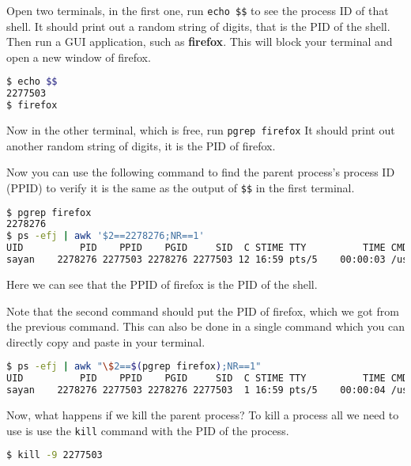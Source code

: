 Open two terminals, in the first one, run \texttt{echo \$\$} to see the
process ID of that shell.
It should print out a random string of digits, that is the PID of the shell.
Then run a GUI application, such as \textbf{firefox}.
This will block your terminal and open a new window of firefox.

\begin{lstlisting}[language=bash]
$ echo $$
2277503
$ firefox
\end{lstlisting}

Now in the other terminal, which is free, run \texttt{pgrep firefox}
It should print out another random string of digits, it is the PID of
firefox.

Now you can use the following command to find the parent process's process
ID (PPID) to verify it is the same as the output of \texttt{\$\$} in the first terminal.

\begin{lstlisting}[language=bash]
$ pgrep firefox
2278276
$ ps -efj | awk '$2==2278276;NR==1'
UID          PID    PPID    PGID     SID  C STIME TTY          TIME CMD
sayan    2278276 2277503 2278276 2277503 12 16:59 pts/5    00:00:03 /usr/lib/firefox/firefox
\end{lstlisting}

Here we can see that the PPID of firefox is the PID of the shell.

Note that the second command should put the PID of firefox, which we got
from the previous command. This can also be done in a single command
which you can directly copy and paste in your terminal.

\begin{lstlisting}[language=bash]
$ ps -efj | awk "\$2==$(pgrep firefox);NR==1"
UID          PID    PPID    PGID     SID  C STIME TTY          TIME CMD
sayan    2278276 2277503 2278276 2277503  1 16:59 pts/5    00:00:04 /usr/lib/firefox/firefox
\end{lstlisting}

Now, what happens if we kill the parent process?
To kill a process all we need to use is use the \texttt{kill}
command with the PID of the process.

\begin{lstlisting}[language=bash]
$ kill -9 2277503
\end{lstlisting}


